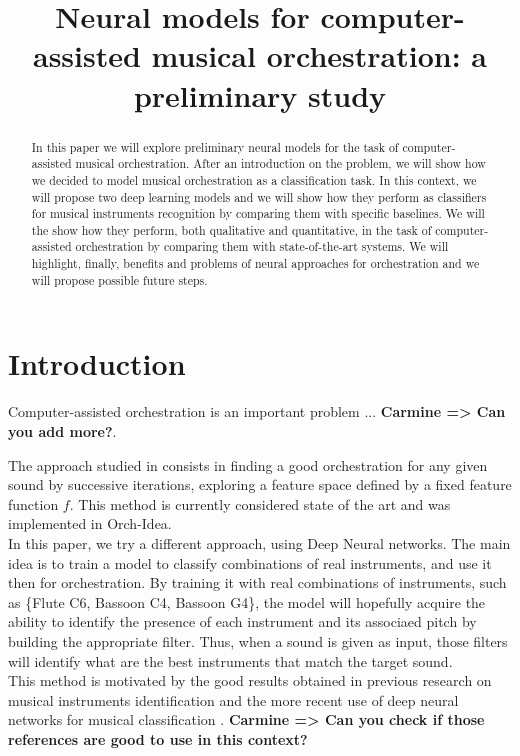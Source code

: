 \documentclass{article}
\title{Neural models for computer-assisted musical orchestration: a preliminary study}
\newcommand{\carmine}[1]{\textbf{\color{red} Carmine => #1}}
\begin{document}
%
\maketitle
%
\begin{abstract}
In this paper we will explore preliminary neural models for the task of computer-assisted musical orchestration. After an introduction on the problem, we will show how we decided to model musical orchestration as a classification task. In this context, we will propose two deep learning models and we will show how they perform as classifiers for musical instruments recognition by comparing them with specific baselines. We will the show how they perform, both qualitative and quantitative, in the task of computer-assisted orchestration by comparing them with state-of-the-art systems. We will highlight, finally, benefits and problems of neural approaches for orchestration and we will propose possible future steps.
\end{abstract}
%
\section{Introduction}\label{sec:introduction}

Computer-assisted orchestration is an important problem ... \carmine{Can you add more?}.

The approach studied in \cite{Cella19} consists in finding a good orchestration for any given sound by successive iterations, exploring a feature space defined by a fixed feature function $f$. This method is currently considered state of the art and was implemented in Orch-Idea.\\

In this paper, we try a different approach, using Deep Neural networks. The main idea is to train a model to classify combinations of real instruments, and use it then for orchestration. By training it with real combinations of instruments, such as \{Flute C6, Bassoon C4, Bassoon G4\}, the model will hopefully acquire the ability to identify the presence of each instrument and its associaed pitch by building the appropriate filter. Thus, when a sound is given as input, those filters will identify what are the best instruments that match the target sound.\\

This method is motivated by the good results obtained in previous research on musical instruments identification \cite{Benetos07}\cite{Kitahara05}\cite{Chetry05} and the more recent use of deep neural networks for musical classification \cite{lostanlen16}\cite{Bian}\cite{Brunner}\cite{Defossez19}. \carmine{Can you check if those references are good to use in this context?}\\
\end{document}
